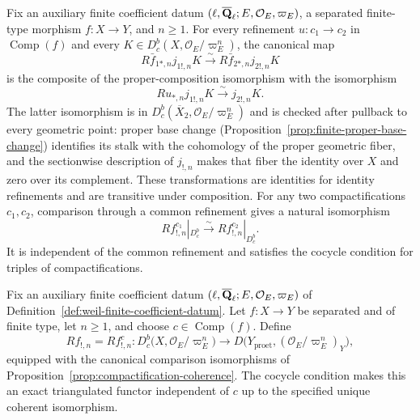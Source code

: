 \begin{proposition}
\label{prop:compactification-coherence}


Fix an auxiliary finite coefficient datum
\((\ell,\overline{\mathbf Q}_\ell;E,\mathcal O_E,\varpi_E)\), a separated finite-type morphism
\(f:X\to Y\), and \(n\geq1\).  For every refinement
\(u:c_1\to c_2\) in \(\operatorname{Comp}(f)\) and every
\(K\in D^b_c(X,\mathcal O_E/\varpi_E^n)\), the canonical map
\[
 R\bar f_{1*,n}j_{1!,n}K
 \xrightarrow{\sim}
 R\bar f_{2*,n}j_{2!,n}K
\]
is the composite of the proper-composition isomorphism with the isomorphism
\[
 Ru_{*,n}j_{1!,n}K\xrightarrow{\sim}j_{2!,n}K.
\]
The latter isomorphism is in
\(D^b_c(\overline X_2,\mathcal O_E/\varpi_E^n)\) and is checked after
pullback to every geometric point: proper base change
(Proposition~\ref{prop:finite-proper-base-change}) identifies its stalk with
the cohomology of the proper geometric fiber, and the sectionwise
description of \(j_{!,n}\) makes that fiber the identity over \(X\) and zero
over its complement.  These transformations are identities for
identity refinements and are transitive under composition.  For any two
compactifications \(c_1,c_2\), comparison through a common refinement gives
a natural isomorphism
\[
 Rf_{!,n}^{c_1}|_{D^b_c}
 \xrightarrow{\sim}Rf_{!,n}^{c_2}|_{D^b_c}.
\]
It is independent of the common refinement and satisfies the cocycle
condition for triples of compactifications.
\end{proposition}



\begin{definition}
\label{def:compact-support-direct-image}


Fix an auxiliary finite coefficient datum
\((\ell,\overline{\mathbf Q}_\ell;E,\mathcal O_E,\varpi_E)\) of
Definition~\ref{def:weil-finite-coefficient-datum}.  Let
\(f:X\to Y\) be separated and of finite type, let \(n\geq1\), and choose
\(c\in\operatorname{Comp}(f)\).  Define
\[
 Rf_{!,n}=Rf_{!,n}^{c}:
 D^b_c\bigl(X,\mathcal O_E/\varpi_E^n\bigr)
 \longrightarrow
 D\bigl(Y_{\mathrm{proet}},(\mathcal O_E/\varpi_E^n)_Y\bigr),
\]
equipped with the canonical comparison isomorphisms of
Proposition~\ref{prop:compactification-coherence}.  The cocycle condition
makes this an exact triangulated functor independent of \(c\) up to the
specified unique coherent isomorphism.
\end{definition}

